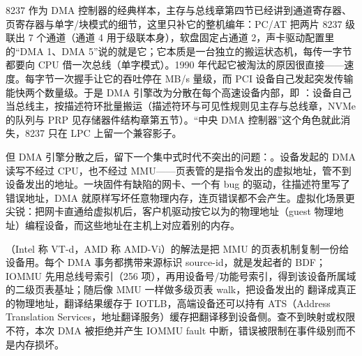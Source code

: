 8237 作为 DMA 控制器的经典样本，主存与总线章第四节已经讲到通道寄存器、页寄存器与单字/块模式的细节，这里只补它的整机编年：PC/AT 把两片 8237 级联出 7 个通道（通道 4 用于级联本身），软盘固定占通道 2，声卡驱动配置里的“DMA 1、DMA 5”说的就是它；它本质是一台独立的搬运状态机，每传一字节都要向 CPU 借一次总线（单字模式）。1990 年代起它被淘汰的原因很直接——速度。每字节一次握手让它的吞吐停在 MB/s 量级，而 PCI 设备自己发起突发传输能快两个数量级。于是 DMA 引擎改为分散在每个高速设备内部，即 ：设备自己当总线主，按描述符环批量搬运（描述符环与可见性规则见主存与总线章，NVMe 的队列与 PRP 见存储器件结构章第五节）。“中央 DMA 控制器”这个角色就此消失，8237 只在 LPC 上留一个兼容影子。

但 DMA 引擎分散之后，留下一个集中式时代不突出的问题：。设备发起的 DMA 读写不经过 CPU，也不经过 MMU——页表管的是指令发出的虚拟地址，管不到设备发出的地址。一块固件有缺陷的网卡、一个有 bug 的驱动，往描述符里写了错误地址，DMA 就原样写坏任意物理内存，连页错误都不会产生。虚拟化场景更尖锐：把网卡直通给虚拟机后，客户机驱动按它以为的物理地址（guest 物理地址）编程设备，而这些地址在主机上对应着别的内存。

（Intel 称 VT-d，AMD 称 AMD-Vi）的解法是把 MMU 的页表机制复制一份给设备用。每个 DMA 事务都携带来源标识 source-id，就是发起者的 BDF；IOMMU 先用总线号索引（256 项），再用设备号/功能号索引，得到该设备所属域的二级页表基址；随后像 MMU 一样做多级页表 walk，把设备发出的  翻译成真正的物理地址，翻译结果缓存于 IOTLB，高端设备还可以持有 ATS（Address Translation Services，地址翻译服务）缓存把翻译移到设备侧。查不到映射或权限不符，本次 DMA 被拒绝并产生 IOMMU fault 中断，错误被限制在事件级别而不是内存损坏。


